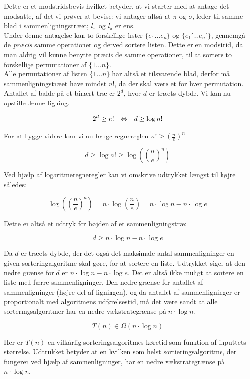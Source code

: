 Dette er et modstridsbevis hvilket betyder, at vi starter med at antage det modsatte, af det vi prøver at bevise: vi antager altså at $\pi$ og $\sigma$, leder til samme blad i sammenligningstræet; $l_{\pi}$ og $l_{\sigma}$ er ens.\\

Under denne antagelse kan to forskellige lister $\{e_1 \dots e_n\}$ og $\{e_1' \dots e_n'\}$, gennemgå de \emph{præcis} samme operationer og derved sortere listen. Dette er en modstrid, da man aldrig vil kunne benytte præcis de samme operationer, til at sortere to forskellige permutationer af $\{1 \dots n\}$. \red{[qed]}\\


Alle permutationer af listen $\{1 \dots n\}$ har altså et tilsvarende blad, derfor må sammenligningstræet have mindst $n!$, da der skal være et for hver permutation.\\

Antallet af balde på et binært træ er $2^d$, hvor $d$ er træets dybde. Vi kan nu opstille denne ligning:


$$2^d \geq n! \:\:\:\Leftrightarrow\:\:\: d \geq \log n!$$

For at bygge videre kan vi nu bruge regnereglen $n! \geq \left( \frac{n}{e} \right)^n$

$$d \geq \log n! \geq \log \left(\left(\frac{n}{e}\right)^n\right)$$

Ved hjælp af logaritmeregneregler kan vi omskrive udtrykket længst til højre således:

$$\log \left(\left(\frac{n}{e}\right)^n\right) = n \cdot \log \left(\frac{n}{e} \right) = n \cdot \log n - n \cdot \log e$$

Dette er altså et udtryk for højden af et sammenligningstræ:

$$d \geq n \cdot \log n - n \cdot \log e$$

Da $d$ er træets dybde, der det også det maksimale antal sammenligninger en given sorteringalgoritme skal gøre, for at sortere en liste. Udtrykket siger at den nedre grænse for $d$ er $n \cdot \log n - n \cdot \log e$. Det er altså ikke muligt at sortere en liste med færre sammenligninger. Den nedre grænse for antallet af sammenligninger (højre del af ligningen), og da antallet af sammenligninger er proportionalt med algoritmens udførelsestid, må det være sandt at alle sorteringsalgoritmer har en nedre vækstrategrænse på $n \cdot \log n$.

$$T(n) \in \Omega (n \cdot \log n)$$

Her er $T(n)$ en vilkårlig sorteringsalgoritmes køretid som funktion af inputtets størrelse. Udtrukket betyder at en hvilken som helst sortieringsalgoritme, der fungerer ved hjælp af sammenligninger, har en nedre vækstrategrænse på $n \cdot \log n$.






